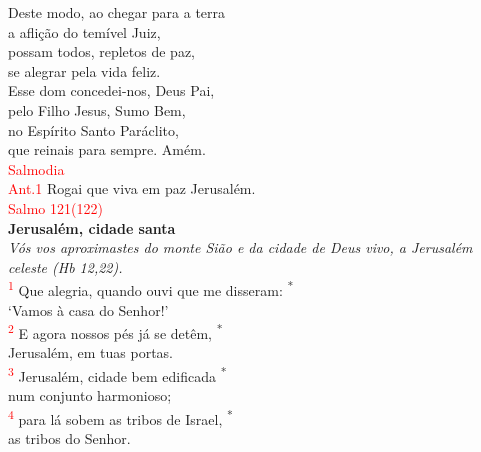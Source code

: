 \documentclass{book}
\begin{document}
\begin{center}
    Deste modo, ao chegar para a terra \\
    a aflição do temível Juiz, \\
    possam todos, repletos de paz, \\
    se alegrar pela vida feliz.
    \vspace{.2cm} \\
    Esse dom concedei-nos, Deus Pai, \\
    pelo Filho Jesus, Sumo Bem, \\
    no Espírito Santo Paráclito, \\
    que reinais para sempre. Amém.
    \vspace{.2cm} \\
    \textcolor{red}{Salmodia}
    \vspace{.2cm} \\
    \textcolor{red}{Ant.1} Rogai que viva em paz Jerusalém.
    \vspace{.2cm} \\
    \textcolor{red}{Salmo 121(122)}
    \vspace{.2cm} \\
    \textbf{Jerusalém, cidade santa} \\
    \textit{Vós vos aproximastes do monte Sião e da cidade de Deus vivo, a Jerusalém celeste (Hb 12,22).}
    \vspace{.2cm} \\
    \textsuperscript{\underline{\hspace{.07in}}\textcolor{red}{1}} Que alegria, quando ouvi que me disseram: \textsuperscript{*} \\
    `Vamos à casa do Senhor!' \\
    \textsuperscript{\underline{\hspace{.07in}}\textcolor{red}{2}} E agora nossos pés já se detêm, \textsuperscript{*} \\
    Jerusalém, em tuas portas.
    \vspace{.2cm} \\
    \textsuperscript{\underline{\hspace{.07in}}\textcolor{red}{3}} Jerusalém, cidade bem edificada \textsuperscript{*} \\
    num conjunto harmonioso; \\
    \textsuperscript{\underline{\hspace{.07in}}\textcolor{red}{4}} para lá sobem as tribos de Israel, \textsuperscript{*} \\
    as tribos do Senhor.
    \vspace{.2cm} \\

\end{center}
\end{document}

